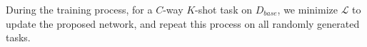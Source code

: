\documentclass[letterpaper]{article} %
\begin{document}
During the training process, for a $C$-way $K$-shot task on $D_{base}$, we minimize $\mathcal{L}$ to update the proposed network, and repeat this process on all randomly generated tasks. 






\end{document}
